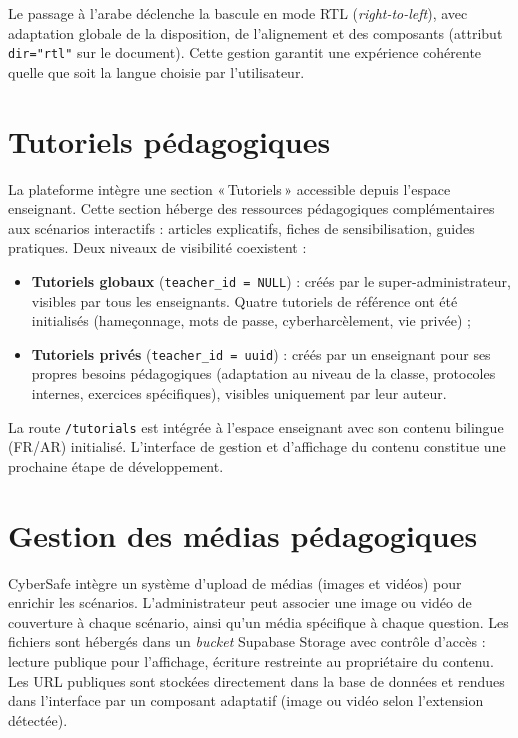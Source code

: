 \documentclass[12pt, a4paper, oneside]{report}
\begin{document}
Le passage à l'arabe déclenche la bascule en mode RTL (\textit{right-to-left}), avec adaptation globale de la disposition, de l'alignement et des composants (attribut \texttt{dir="rtl"} sur le document). Cette gestion garantit une expérience cohérente quelle que soit la langue choisie par l'utilisateur.

\section{Tutoriels pédagogiques}
La plateforme intègre une section «\,Tutoriels\,» accessible depuis l'espace enseignant. Cette section héberge des ressources pédagogiques complémentaires aux scénarios interactifs : articles explicatifs, fiches de sensibilisation, guides pratiques. Deux niveaux de visibilité coexistent :

\begin{itemize}[leftmargin=*]
  \item \textbf{Tutoriels globaux} (\texttt{teacher\_id = NULL}) : créés par le super-administrateur, visibles par tous les enseignants. Quatre tutoriels de référence ont été initialisés (hameçonnage, mots de passe, cyberharcèlement, vie privée) ;
  \item \textbf{Tutoriels privés} (\texttt{teacher\_id = uuid}) : créés par un enseignant pour ses propres besoins pédagogiques (adaptation au niveau de la classe, protocoles internes, exercices spécifiques), visibles uniquement par leur auteur.
\end{itemize}

La route \texttt{/tutorials} est intégrée à l'espace enseignant avec son contenu bilingue (FR/AR) initialisé. L'interface de gestion et d'affichage du contenu constitue une prochaine étape de développement.

\section{Gestion des médias pédagogiques}
CyberSafe intègre un système d'upload de médias (images et vidéos) pour enrichir les scénarios. L'administrateur peut associer une image ou vidéo de couverture à chaque scénario, ainsi qu'un média spécifique à chaque question. Les fichiers sont hébergés dans un \textit{bucket} Supabase Storage avec contrôle d'accès : lecture publique pour l'affichage, écriture restreinte au propriétaire du contenu. Les URL publiques sont stockées directement dans la base de données et rendues dans l'interface par un composant adaptatif (image ou vidéo selon l'extension détectée).
\end{document}
